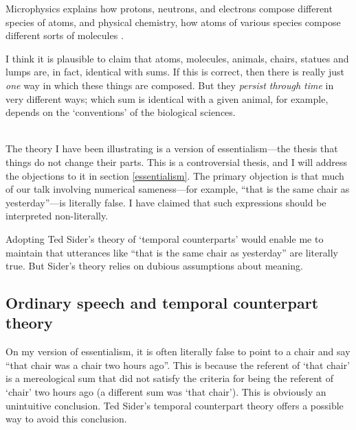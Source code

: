 \documentclass[11pt]{article}
\newenvironment{squote}{%
\begin{spacing}{1}
\begin{list}{}{%
\setlength{\labelwidth}{0pt}%
\rightmargin\leftmargin%
}
\item\relax
}{%
\end{list}%
\end{spacing}
}
\begin{document}
\begin{spacing}{1.5}
\begin{squote}
Microphysics explains how protons, neutrons, and electrons compose
different species of atoms, and physical chemistry, how atoms of
various species compose different sorts of molecules
\citep[706]{rosenberg1993}.
\end{squote}

I think it is plausible to claim that atoms, molecules, animals,
chairs, statues and lumps are, in fact, identical with sums.  If this
is correct, then there is really just {\em one} way in which these
things are composed.  But they {\em persist through time} in very
different ways; which sum is identical with a given animal, for
example, depends on the `conventions' of the biological sciences.

\\

The theory I have been illustrating is a version of essentialism---the
thesis that things do not change their parts.  This is a controversial
thesis, and I will address the objections to it in section
\ref{essentialism}.  The primary objection is that much of our talk
involving numerical sameness---for example, ``that is the same chair
as yesterday''---is literally false.  I have claimed that such
expressions should be interpreted non-literally.

Adopting Ted Sider's theory of `temporal counterparts' would enable me
to maintain that utterances like ``that is the same chair as
yesterday'' are literally true.  But Sider's theory relies on dubious
assumptions about meaning.




\subsection{Ordinary speech and temporal counterpart theory}
\label{counterpart}
On my version of essentialism, it is often literally false to point to
a chair and say ``that chair was a chair two hours ago''.  This is
because the referent of `that chair' is a mereological sum that did
not satisfy the criteria for being the referent of `chair' two hours
ago (a different sum was `that chair').  This is obviously an
unintuitive conclusion.  Ted Sider's temporal counterpart theory
offers a possible way to avoid this conclusion.


\end{spacing}
\end{document}
